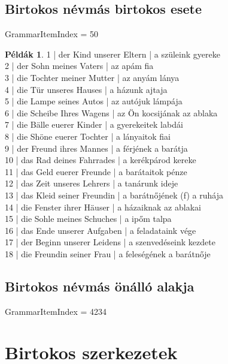 \documentclass{article}
\theoremstyle{definition}
\newtheorem*{exmp}{Példák}
\begin{document}
\subsection{Birtokos névmás birtokos esete}

GrammarItemIndex = 50

\begin{exmp}
1 | der Kind unserer Eltern | a szüleink gyereke\\
2 | der Sohn meines Vaters | az apám fia\\
3 | die Tochter meiner Mutter | az anyám lánya\\
4 | die Tür unseres Hauses | a házunk ajtaja\\
5 | die Lampe seines Autos | az autójuk lámpája\\
6 | die Scheibe Ihres Wagens | az Ön kocsijának az ablaka\\
7 | die Bälle euerer Kinder | a gyerekeitek labdái\\
8 | die Shöne euerer Tochter | a lányaitok fiai\\
9 | der Freund ihres Mannes | a férjének a barátja\\
10 | das Rad deines Fahrrades | a kerékpárod kereke\\
11 | das Geld euerer Freunde | a barátaitok pénze\\
12 | das Zeit unseres Lehrers | a tanárunk ideje\\
13 | das Kleid seiner Freundin | a barátnőjének (f) a ruhája\\
14 | die Fenster ihrer Häuser | a házaiknak az ablakai\\
15 | die Sohle meines Schuches | a ipőm talpa\\
16 | das Ende unserer Aufgaben | a feladataink vége\\
17 | der Beginn unserer Leidens | a szenvedéseink kezdete\\
18 | die Freundin seiner Frau | a feleségének a barátnője\\
\end{exmp}

\subsection{Birtokos névmás önálló alakja}

GrammarItemIndex = 4234

\section{Birtokos szerkezetek}
\end{document}
